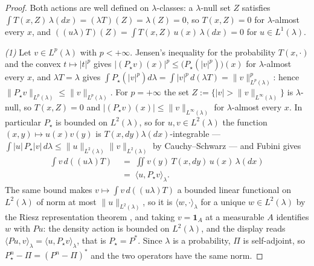 \begin{proof}
Both actions are well defined on $\lambda$-classes: a $\lambda$-null set $Z$ satisfies
$\int T(x,Z)\,\lambda(dx)=(\lambda T)(Z)=\lambda(Z)=0$, so $T(x,Z)=0$ for $\lambda$-almost
every $x$, and $\left((u\lambda)T\right)(Z)=\int T(x,Z)\,u(x)\,\lambda(dx)=0$ for
$u\in L^1(\lambda)$.

\emph{(1)} Let $v\in L^p(\lambda)$ with $p<+\infty$. Jensen's inequality for the probability
$T(x,\cdot)$ and the convex $t\mapsto|t|^p$ gives
$|(P_\star v)(x)|^p\leq\bigl(P_\star\left(|v|^p\right)\bigr)(x)$ for $\lambda$-almost every
$x$, and $\lambda T=\lambda$ gives
$\int P_\star\left(|v|^p\right)d\lambda=\int|v|^p\,d(\lambda T)=\|v\|^p_{L^p(\lambda)}$: hence
$\|P_\star v\|_{L^p(\lambda)}\leq\|v\|_{L^p(\lambda)}$. For $p=+\infty$ the set
$Z:=\{|v|>\|v\|_{L^\infty(\lambda)}\}$ is $\lambda$-null, so $T(x,Z)=0$ and
$|(P_\star v)(x)|\leq\|v\|_{L^\infty(\lambda)}$ for $\lambda$-almost every $x$. In particular
$P_\star$ is bounded on $L^2(\lambda)$, so for $u,v\in L^2(\lambda)$ the function
$(x,y)\mapsto u(x)v(y)$ is $T(x,dy)\lambda(dx)$-integrable ---
$\int|u|\,P_\star|v|\,d\lambda\leq\|u\|_{L^2(\lambda)}\|v\|_{L^2(\lambda)}$ by Cauchy--Schwarz
--- and Fubini gives
\begin{equation}
\begin{aligned}
    \int v\,d\left((u\lambda)T\right)\;&=\;\iint v(y)\,T(x,dy)\,u(x)\,\lambda(dx)\\
    &=\;\langle u,P_\star v\rangle_\lambda .
\end{aligned}
\end{equation}
The same bound makes $v\mapsto\int v\,d\left((u\lambda)T\right)$ a bounded linear functional
on $L^2(\lambda)$ of norm at most $\|u\|_{L^2(\lambda)}$, so it is
$\langle w,\cdot\rangle_\lambda$ for a unique $w\in L^2(\lambda)$ by the Riesz representation
theorem \citep{brezis2011functional}, and taking $v=\mathbf 1_A$ at a measurable $A$ identifies
$w$ with $Pu$: the density action is bounded on $L^2(\lambda)$, and the display reads
$\langle Pu,v\rangle_\lambda=\langle u,P_\star v\rangle_\lambda$, that is $P_\star=P^*$. Since
$\lambda$ is a probability, $\Pi$ is self-adjoint, so $P_\star^n-\Pi=(P^n-\Pi)^*$ and the two
operators have the same norm.


\end{proof}

